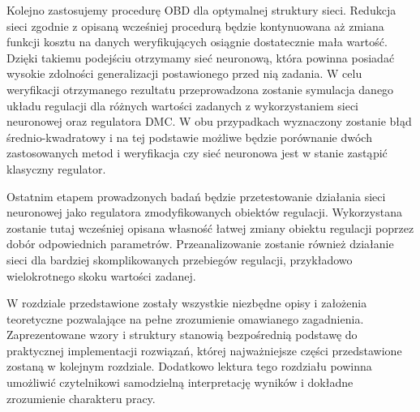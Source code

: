 \par Kolejno zastosujemy procedurę OBD dla optymalnej struktury sieci. Redukcja sieci zgodnie z opisaną wcześniej procedurą będzie kontynuowana aż zmiana funkcji kosztu na danych weryfikujących osiągnie dostatecznie mała wartość. Dzięki takiemu podejściu otrzymamy sieć neuronową, która powinna posiadać wysokie zdolności generalizacji postawionego przed nią zadania. W celu weryfikacji otrzymanego rezultatu przeprowadzona zostanie symulacja danego układu regulacji dla różnych wartości zadanych z wykorzystaniem sieci neuronowej oraz regulatora DMC. W obu przypadkach wyznaczony zostanie błąd średnio-kwadratowy i na tej podstawie możliwe będzie porównanie dwóch zastosowanych metod i weryfikacja czy sieć neuronowa jest w stanie zastąpić klasyczny regulator.
\par Ostatnim etapem prowadzonych badań będzie przetestowanie działania sieci neuronowej jako regulatora zmodyfikowanych obiektów regulacji. Wykorzystana zostanie tutaj wcześniej opisana własność łatwej zmiany obiektu regulacji poprzez dobór odpowiednich parametrów. Przeanalizowanie zostanie również działanie sieci dla bardziej skomplikowanych przebiegów regulacji, przykładowo wielokrotnego skoku wartości zadanej.
\vspace{8mm}
\par W rozdziale przedstawione zostały wszystkie niezbędne opisy i założenia teoretyczne pozwalające na pełne zrozumienie omawianego zagadnienia. Zaprezentowane wzory i struktury stanowią bezpośrednią podstawę do praktycznej implementacji rozwiązań, której najważniejsze części przedstawione zostaną w kolejnym rozdziale. Dodatkowo lektura tego rozdziału powinna umożliwić czytelnikowi samodzielną interpretację wyników i dokładne zrozumienie charakteru pracy.   
      


